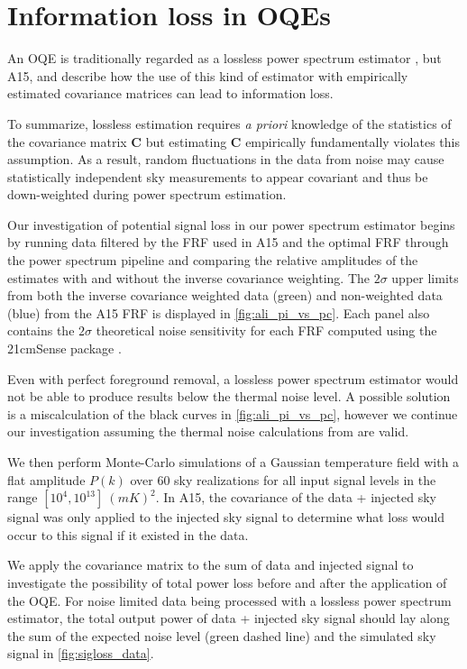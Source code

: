 \documentclass[preprint2,hidelinks]{emulateapj}
\begin{document}
\section{Information loss in OQEs}\label{sec:sigloss}{
An OQE is traditionally regarded as a lossless power spectrum estimator \citep{tegmark1997}, but A15, \citet{dillon_et_al2015} and \citet{switzer_liu2014} describe how the use of this kind of estimator with empirically estimated covariance matrices can lead to information loss. 

To summarize, lossless estimation requires \emph{a priori} knowledge of the statistics of the covariance matrix $\mathbf{C}$ but estimating $\mathbf{C}$ empirically fundamentally violates this assumption.
As a result, random fluctuations in the data from noise may cause statistically independent sky measurements to appear covariant and thus be down-weighted during power spectrum estimation.


 Our investigation of potential signal loss in our power spectrum estimator begins by running data filtered by the FRF used in A15 and the optimal FRF through the power spectrum pipeline and comparing the relative amplitudes of the estimates with and without the inverse covariance weighting. The $2\sigma$ upper limits from both the inverse covariance weighted data (green) and non-weighted data (blue) from the A15 FRF %
 is displayed in \autoref{fig:ali_pi_vs_pc}. Each panel also contains the $2\sigma$ theoretical noise sensitivity for each FRF computed using the 21cmSense package \citep{pober_et_al2013}. 
 
  Even with perfect foreground removal, a lossless power spectrum estimator would not be able to produce results below the thermal noise level. A possible solution is a miscalculation of the black curves in \autoref{fig:ali_pi_vs_pc}, however we continue our investigation assuming the thermal noise calculations from \citet{pober_et_al2013} are valid.
 
 We then perform Monte-Carlo simulations of a Gaussian temperature field with a flat amplitude $P(k)$ over 60 sky realizations for all input signal levels in the range $[10^{4},10^{13}]\ (mK)^{2}$. In A15, the covariance of the data + injected sky signal was only applied to the injected sky signal to determine what loss would occur to this signal if it existed in the data.
 
  We apply the covariance matrix to the sum of data and injected signal to investigate the possibility of total power loss before and after the application of the OQE. For noise limited data being processed with a lossless power spectrum estimator, the total output power of data + injected sky signal should lay along the sum of the expected noise level (green dashed line) and the simulated sky signal in \autoref{fig:sigloss_data}.
  
}
\end{document}
